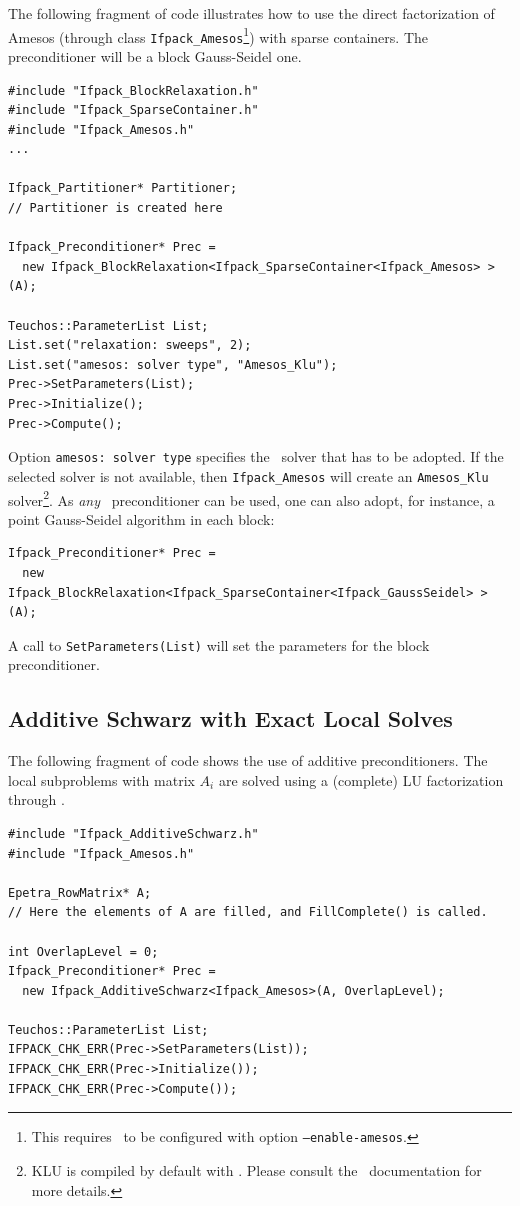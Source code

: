 The following fragment of code illustrates how to use the direct factorization
of Amesos (through class \verb!Ifpack_Amesos!\footnote{This requires \ifpack\
	   to be configured with option {\tt --enable-amesos}.}) with sparse containers. The preconditioner will be a block Gauss-Seidel one.

\begin{verbatim}
#include "Ifpack_BlockRelaxation.h"
#include "Ifpack_SparseContainer.h"
#include "Ifpack_Amesos.h"
...

Ifpack_Partitioner* Partitioner;
// Partitioner is created here

Ifpack_Preconditioner* Prec =
  new Ifpack_BlockRelaxation<Ifpack_SparseContainer<Ifpack_Amesos> >(A);

Teuchos::ParameterList List;
List.set("relaxation: sweeps", 2);
List.set("amesos: solver type", "Amesos_Klu");
Prec->SetParameters(List);
Prec->Initialize();
Prec->Compute();
\end{verbatim}

Option \verb!amesos: solver type! specifies the \amesos\ solver that
has to be adopted. If the selected solver is not available, then
\verb!Ifpack_Amesos! will create an \verb!Amesos_Klu! solver\footnote{KLU is
  compiled by default with \amesos. Please consult the \amesos\ documentation
    for more details.}.
As {\sl any} \ifpack\ preconditioner can be used, one can also adopt, for
instance, a point Gauss-Seidel algorithm in each block:
\begin{verbatim}
Ifpack_Preconditioner* Prec =
  new Ifpack_BlockRelaxation<Ifpack_SparseContainer<Ifpack_GaussSeidel> >(A);
\end{verbatim}

A call to \verb!SetParameters(List)! will set the parameters for the block
preconditioner.

\subsection{Additive Schwarz with Exact Local Solves}
\label{sec:as_amesos}

The following fragment of code shows the use of additive preconditioners. The
local subproblems with matrix $A_i$ are solved using a (complete) LU
factorization through \amesos.
\begin{verbatim}
#include "Ifpack_AdditiveSchwarz.h"
#include "Ifpack_Amesos.h"

Epetra_RowMatrix* A;
// Here the elements of A are filled, and FillComplete() is called.

int OverlapLevel = 0;
Ifpack_Preconditioner* Prec = 
  new Ifpack_AdditiveSchwarz<Ifpack_Amesos>(A, OverlapLevel);

Teuchos::ParameterList List;
IFPACK_CHK_ERR(Prec->SetParameters(List));
IFPACK_CHK_ERR(Prec->Initialize());
IFPACK_CHK_ERR(Prec->Compute());
\end{verbatim}


